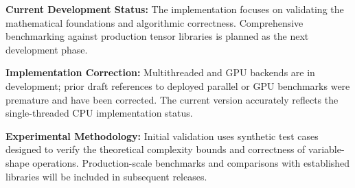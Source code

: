 \textbf{Current Development Status:} The implementation focuses on validating the mathematical foundations and algorithmic correctness. Comprehensive benchmarking against production tensor libraries is planned as the next development phase.

\textbf{Implementation Correction:} Multithreaded and GPU backends are in development; prior draft references to deployed parallel or GPU benchmarks were premature and have been corrected. The current version accurately reflects the single-threaded CPU implementation status.

\textbf{Experimental Methodology:} Initial validation uses synthetic test cases designed to verify the theoretical complexity bounds and correctness of variable-shape operations. Production-scale benchmarks and comparisons with established libraries will be included in subsequent releases.
